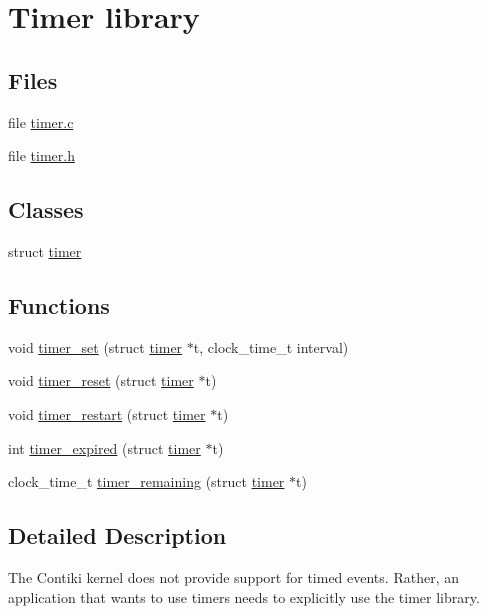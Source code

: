 \hypertarget{group__timer}{\section{Timer library}
\label{group__timer}
}
\subsection*{Files}
\begin{DoxyCompactItemize}
\item 
file \hyperlink{timer_8c}{timer.\-c}
\item 
file \hyperlink{timer_8h}{timer.\-h}
\end{DoxyCompactItemize}
\subsection*{Classes}
\begin{DoxyCompactItemize}
\item 
struct \hyperlink{structtimer}{timer}
\end{DoxyCompactItemize}
\subsection*{Functions}
\begin{DoxyCompactItemize}
\item 
void \hyperlink{group__timer_ga6614d96fdfcd95c95ec6e6f63071ff51}{timer\-\_\-set} (struct \hyperlink{structtimer}{timer} $\ast$t, clock\-\_\-time\-\_\-t interval)
\item 
void \hyperlink{group__timer_gaedaf3e48c2b04229b85455fb948468d6}{timer\-\_\-reset} (struct \hyperlink{structtimer}{timer} $\ast$t)
\item 
void \hyperlink{group__timer_gacb807bd57e5489b386b876af5c1f163a}{timer\-\_\-restart} (struct \hyperlink{structtimer}{timer} $\ast$t)
\item 
int \hyperlink{group__timer_ga6d71dececfce707c668e6257aad5906e}{timer\-\_\-expired} (struct \hyperlink{structtimer}{timer} $\ast$t)
\item 
clock\-\_\-time\-\_\-t \hyperlink{group__timer_gaa10c14f8082ea8b10dfbefb81e1fa2e0}{timer\-\_\-remaining} (struct \hyperlink{structtimer}{timer} $\ast$t)
\end{DoxyCompactItemize}


\subsection{Detailed Description}
The Contiki kernel does not provide support for timed events. Rather, an application that wants to use timers needs to explicitly use the timer library.

